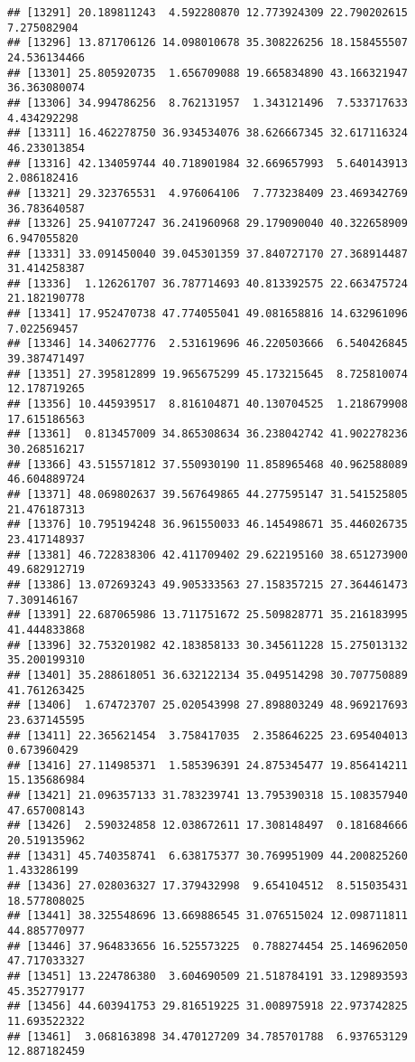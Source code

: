 \documentclass[
]{article}
\begin{document}
\begin{verbatim}
## [13291] 20.189811243  4.592280870 12.773924309 22.790202615  7.275082904
## [13296] 13.871706126 14.098010678 35.308226256 18.158455507 24.536134466
## [13301] 25.805920735  1.656709088 19.665834890 43.166321947 36.363080074
## [13306] 34.994786256  8.762131957  1.343121496  7.533717633  4.434292298
## [13311] 16.462278750 36.934534076 38.626667345 32.617116324 46.233013854
## [13316] 42.134059744 40.718901984 32.669657993  5.640143913  2.086182416
## [13321] 29.323765531  4.976064106  7.773238409 23.469342769 36.783640587
## [13326] 25.941077247 36.241960968 29.179090040 40.322658909  6.947055820
## [13331] 33.091450040 39.045301359 37.840727170 27.368914487 31.414258387
## [13336]  1.126261707 36.787714693 40.813392575 22.663475724 21.182190778
## [13341] 17.952470738 47.774055041 49.081658816 14.632961096  7.022569457
## [13346] 14.340627776  2.531619696 46.220503666  6.540426845 39.387471497
## [13351] 27.395812899 19.965675299 45.173215645  8.725810074 12.178719265
## [13356] 10.445939517  8.816104871 40.130704525  1.218679908 17.615186563
## [13361]  0.813457009 34.865308634 36.238042742 41.902278236 30.268516217
## [13366] 43.515571812 37.550930190 11.858965468 40.962588089 46.604889724
## [13371] 48.069802637 39.567649865 44.277595147 31.541525805 21.476187313
## [13376] 10.795194248 36.961550033 46.145498671 35.446026735 23.417148937
## [13381] 46.722838306 42.411709402 29.622195160 38.651273900 49.682912719
## [13386] 13.072693243 49.905333563 27.158357215 27.364461473  7.309146167
## [13391] 22.687065986 13.711751672 25.509828771 35.216183995 41.444833868
## [13396] 32.753201982 42.183858133 30.345611228 15.275013132 35.200199310
## [13401] 35.288618051 36.632122134 35.049514298 30.707750889 41.761263425
## [13406]  1.674723707 25.020543998 27.898803249 48.969217693 23.637145595
## [13411] 22.365621454  3.758417035  2.358646225 23.695404013  0.673960429
## [13416] 27.114985371  1.585396391 24.875345477 19.856414211 15.135686984
## [13421] 21.096357133 31.783239741 13.795390318 15.108357940 47.657008143
## [13426]  2.590324858 12.038672611 17.308148497  0.181684666 20.519135962
## [13431] 45.740358741  6.638175377 30.769951909 44.200825260  1.433286199
## [13436] 27.028036327 17.379432998  9.654104512  8.515035431 18.577808025
## [13441] 38.325548696 13.669886545 31.076515024 12.098711811 44.885770977
## [13446] 37.964833656 16.525573225  0.788274454 25.146962050 47.717033327
## [13451] 13.224786380  3.604690509 21.518784191 33.129893593 45.352779177
## [13456] 44.603941753 29.816519225 31.008975918 22.973742825 11.693522322
## [13461]  3.068163898 34.470127209 34.785701788  6.937653129 12.887182459

\end{verbatim}
\end{document}
